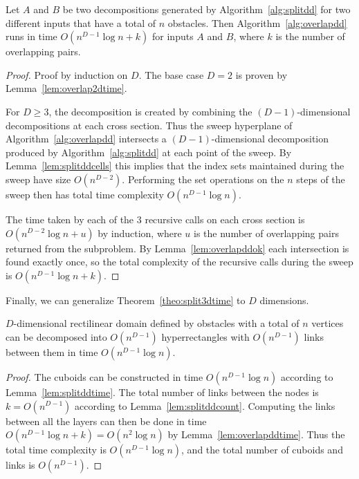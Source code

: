 \documentclass[english,gradu]{tktltiki2018}
\begin{document}
\begin{lem}\label{lem:overlapddtime}
Let $A$ and $B$ be two decompositions generated by Algorithm~\ref{alg:splitdd} for two different inputs that have a total of $n$ obstacles.
Then Algorithm~\ref{alg:overlapdd} runs in time $O(n^{D-1}\log n + k)$ for inputs $A$ and $B$, where $k$ is the number of overlapping pairs.
\end{lem}
\begin{proof}
Proof by induction on $D$.
The base case $D=2$ is proven by Lemma~\ref{lem:overlap2dtime}.

For $D\ge 3$, the decomposition is created by combining the $(D-1)$-dimensional decompositions at each cross section.
Thus the sweep hyperplane of Algorithm~\ref{alg:overlapdd} intersects a $(D-1)$-dimensional decomposition produced by Algorithm~\ref{alg:splitdd} at each point of the sweep.
By Lemma~\ref{lem:splitddcells} this implies that the index sets maintained during the sweep have size $O(n^{D-2})$.
Performing the set operations on the $n$ steps of the sweep then has total time complexity $O(n^{D-1}\log n)$.

The time taken by each of the 3 recursive calls on each cross section is $O(n^{D-2}\log n + u)$ by induction, where $u$ is the number of overlapping pairs returned from the subproblem.
By Lemma~\ref{lem:overlapddok} each intersection is found exactly once, so the total complexity of the recursive calls during the sweep is $O(n^{D-1}\log n + k)$.
\end{proof}

Finally, we can generalize Theorem~\ref{theo:split3dtime} to $D$ dimensions.

\begin{theo}\label{theo:splitddtime}$D$-dimensional rectilinear domain defined by obstacles with a total of $n$ vertices can be decomposed into $O(n^{D-1})$ hyperrectangles with $O(n^{D-1})$ links between them in time $O(n^{D-1}\log n).$\end{theo}
\begin{proof}
The cuboids can be constructed in time $O(n^{D-1}\log n)$ according to Lemma~\ref{lem:splitddtime}.
The total number of links between the nodes is $k=O(n^{D-1})$ according to Lemma~\ref{lem:splitddcount}.
Computing the links between all the layers can then be done in time $O(n^{D-1}\log n+k)=O(n^2\log n)$ by Lemma~\ref{lem:overlapddtime}.
Thus the total time complexity is $O(n^{D-1}\log n)$, and the total number of cuboids and links is $O(n^{D-1})$.
\end{proof}
\end{document}
